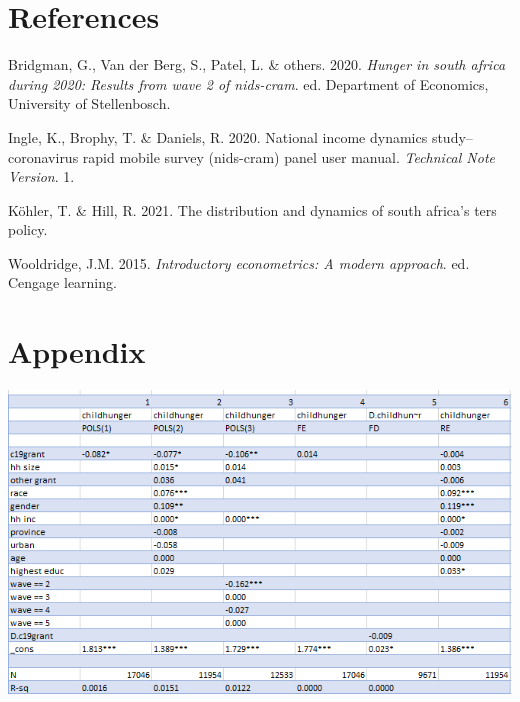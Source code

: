 \documentclass[11pt,preprint, authoryear]{elsarticle}
\let\origfigure\figure
\let\endorigfigure\endfigure
\renewenvironment{figure}[1][2] {
    \expandafter\origfigure\expandafter[H]
} {
    \endorigfigure
}
\numberwithin{equation}{section}
\numberwithin{figure}{section}
\numberwithin{table}{section}
\begin{document}
\newpage

\hypertarget{references}{%
\section*{References}\label{references}}

\hypertarget{refs}{}
\leavevmode\hypertarget{ref-bridgman2020hunger}{}%
Bridgman, G., Van der Berg, S., Patel, L. \& others. 2020. \emph{Hunger
in south africa during 2020: Results from wave 2 of nids-cram}. ed.
Department of Economics, University of Stellenbosch.

\leavevmode\hypertarget{ref-nids2020}{}%
Ingle, K., Brophy, T. \& Daniels, R. 2020. National income dynamics
study--coronavirus rapid mobile survey (nids-cram) panel user manual.
\emph{Technical Note Version}. 1.

\leavevmode\hypertarget{ref-kohler2021distribution}{}%
Köhler, T. \& Hill, R. 2021. The distribution and dynamics of south
africa's ters policy.

\leavevmode\hypertarget{ref-wooldridge}{}%
Wooldridge, J.M. 2015. \emph{Introductory econometrics: A modern
approach}. ed. Cengage learning.

\newpage

\hypertarget{appendix}{%
\section*{\texorpdfstring{Appendix
\label{appendix}}{Appendix }}\label{appendix}}

\begin{figure}[H]
\includegraphics[width=1\linewidth]{figures/childhunger_table} \caption{\label{results_child} Table of Results - Child Hunger (Own Calculations, Data: NIDS-CRAM)}\label{fig:results_child}
\end{figure}
\end{document}
